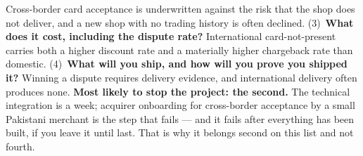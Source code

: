 \begin{ans}
        Cross-border card acceptance is underwritten against the risk that the
        shop does not deliver, and a new shop with no trading history is often
        declined. (3)~\textbf{What does it cost, including the dispute rate?}
        International card-not-present carries both a higher discount rate and
        a materially higher chargeback rate than domestic. (4)~\textbf{What
        will you ship, and how will you prove you shipped it?} Winning a
        dispute requires delivery evidence, and international delivery often
        produces none. \textbf{Most likely to stop the project: the second.}
        The technical integration is a week; acquirer onboarding for
        cross-border acceptance by a small Pakistani merchant is the step that
        fails --- and it fails after everything has been built, if you leave it
        until last. That is why it belongs second on this list and not fourth.
\end{ans}


